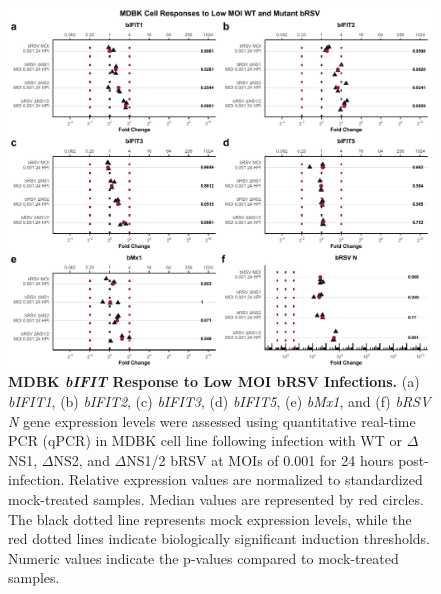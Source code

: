 \begin{figure}
    \centering
    \includegraphics[width=1\linewidth]{07. Chapter 2/Figs/02. Induction/06. mdbk_brsv_low_moi.pdf}
    \caption[MDBK \textit{bIFIT} Response to Low MOI bRSV Infections.]{\textbf{MDBK \textit{bIFIT} Response to Low MOI bRSV Infections.} (a) \textit{bIFIT1}, (b) \textit{bIFIT2}, (c) \textit{bIFIT3}, (d) \textit{bIFIT5}, (e) \textit{bMx1}, and (f) \textit{bRSV N} gene expression levels were assessed using quantitative real-time PCR (qPCR) in MDBK cell line following infection with WT or \(\Delta\)NS1, \(\Delta\)NS2, and \(\Delta\)NS1/2 bRSV at MOIs of 0.001 for 24 hours post-infection. Relative expression values are normalized to standardized mock-treated samples. Median values are represented by red circles. The black dotted line represents mock expression levels, while the red dotted lines indicate biologically significant induction thresholds. Numeric values indicate the p-values compared to mock-treated samples.}
    \label{fig:MDBK responses to low MOI mutant bRSV}
\end{figure}

